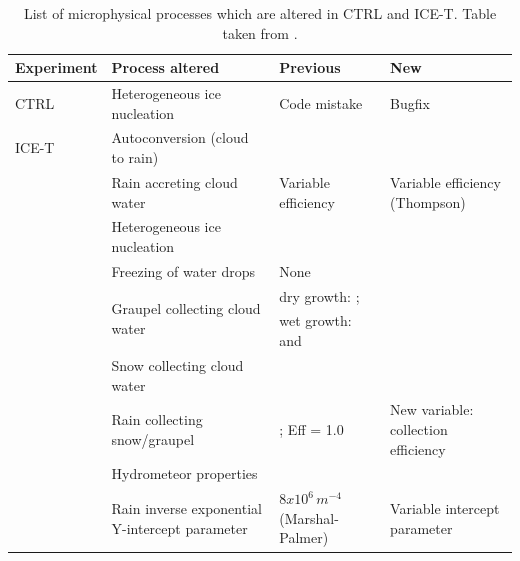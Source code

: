 \documentclass{ametsocV5}
\begin{document}
%
\begin{table}[t]
	\caption{List of microphysical processes which are altered in CTRL and ICE-T. Table taken from \cite{engdahl_improving_2020}.}
	\label{tab:micr_changes}
	\begin{center}
		\begin{tabular}{p{}||p{}|p{}|p{}} \hline\hline
			Experiment & Process altered               & Previous     & New \\ \hline \hline
			CTRL       & Heterogeneous ice nucleation  & Code mistake & Bugfix \\\hline
			ICE-T      & Autoconversion (cloud to rain)&\citet{khairoutdinov_new_2000} &\citet{berry_analysis_1974}\\
			& Rain accreting cloud water      & Variable efficiency \citep{muller_arome-metcoop:_2017}   & Variable efficiency (Thompson) \\
			& Heterogeneous ice nucleation    & \citet{meyers_new_1992}          & \citet{cooper_ice_1986} \\
			& Freezing of water drops        & None                         & \citet{bigg_supercooling_1953} \\
			& \multirow{2}{*}{Graupel collecting cloud water} & dry growth: \citet{ferrier_double-moment_1994}; & \multirow{2}{*}{\citet{cober_measurements_1993}} \\
			&                                                  & wet growth: \citet{musil_computer_1970} and \citet{nelson_influence_1983} &\\
			& Snow collecting cloud water     & \citet{farley_numerical_1989} & \citet{wang_collision_2000} \\
			& Rain collecting snow/graupel    & \citet{ferrier_double-moment_1994}; Eff = 1.0 & New variable: collection efficiency \\
			& Hydrometeor properties         & \citet{locatelli_fall_1974} & \citet{thompson_explicit_2008} \\
			& Rain inverse exponential Y-intercept parameter & $8x10^{6}\, m^{-4}$ (Marshal-Palmer) & Variable intercept parameter \citep{thompson_explicit_2004} \\ \hline
			
			
		\end{tabular}
	\end{center}
\end{table}
\end{document}
